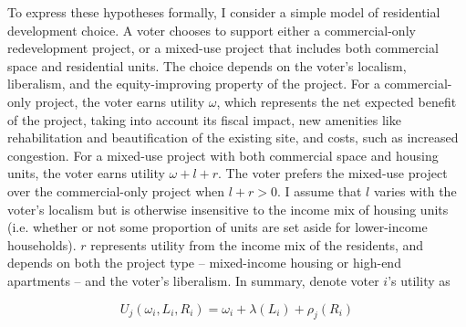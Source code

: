 \documentclass[article,11pt]{memoir}
\begin{document}

To express these hypotheses formally, I consider a simple model of residential development choice.  A voter chooses to support either a commercial-only redevelopment project, or a mixed-use project that includes both commercial space and residential units.  The choice depends on the voter's localism, liberalism, and the equity-improving property of the project.  For a commercial-only project, the voter earns utility $\omega$, which represents the net expected benefit of the project, taking into account its fiscal impact, new amenities like rehabilitation and beautification of the existing site, and costs, such as increased congestion.  For a mixed-use project with both commercial space and housing units, the voter earns utility $\omega + l + r$.  The voter prefers the mixed-use project over the commercial-only project when $l + r > 0$.  I assume that $l$ varies with the voter's localism but is otherwise insensitive to the income mix of housing units (i.e. whether or not some proportion of units are set aside for lower-income households). $r$ represents utility from the income mix of the residents, and depends on both the project type -- mixed-income housing or high-end apartments -- and the voter's liberalism.  In summary, denote voter $i$'s utility as

\[
U_j(\omega_i, L_i, R_i) = \omega_i + \lambda(L_i) + \rho_j(R_i)
\]
\end{document}
